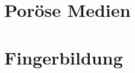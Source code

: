 
\label{sec:theo}
\section{Poröse Medien}
\label{theo:por}

\section{Fingerbildung}
\label{theo:fing}